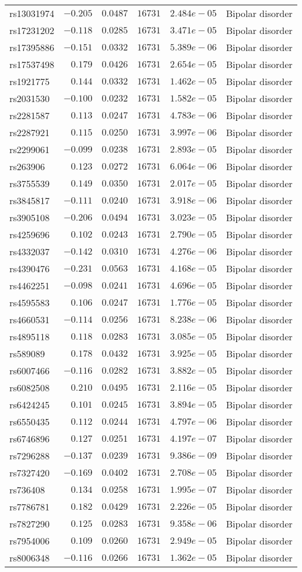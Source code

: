 \begin{tabular}{lrrrrl}
rs13031974&$-0.205$&$0.0487$&$ 16731$&$2.484e-05$&Bipolar disorder\tabularnewline
rs17231202&$-0.118$&$0.0285$&$ 16731$&$3.471e-05$&Bipolar disorder\tabularnewline
rs17395886&$-0.151$&$0.0332$&$ 16731$&$5.389e-06$&Bipolar disorder\tabularnewline
rs17537498&$ 0.179$&$0.0426$&$ 16731$&$2.654e-05$&Bipolar disorder\tabularnewline
rs1921775&$ 0.144$&$0.0332$&$ 16731$&$1.462e-05$&Bipolar disorder\tabularnewline
rs2031530&$-0.100$&$0.0232$&$ 16731$&$1.582e-05$&Bipolar disorder\tabularnewline
rs2281587&$ 0.113$&$0.0247$&$ 16731$&$4.783e-06$&Bipolar disorder\tabularnewline
rs2287921&$ 0.115$&$0.0250$&$ 16731$&$3.997e-06$&Bipolar disorder\tabularnewline
rs2299061&$-0.099$&$0.0238$&$ 16731$&$2.893e-05$&Bipolar disorder\tabularnewline
rs263906&$ 0.123$&$0.0272$&$ 16731$&$6.064e-06$&Bipolar disorder\tabularnewline
rs3755539&$ 0.149$&$0.0350$&$ 16731$&$2.017e-05$&Bipolar disorder\tabularnewline
rs3845817&$-0.111$&$0.0240$&$ 16731$&$3.918e-06$&Bipolar disorder\tabularnewline
rs3905108&$-0.206$&$0.0494$&$ 16731$&$3.023e-05$&Bipolar disorder\tabularnewline
rs4259696&$ 0.102$&$0.0243$&$ 16731$&$2.790e-05$&Bipolar disorder\tabularnewline
rs4332037&$-0.142$&$0.0310$&$ 16731$&$4.276e-06$&Bipolar disorder\tabularnewline
rs4390476&$-0.231$&$0.0563$&$ 16731$&$4.168e-05$&Bipolar disorder\tabularnewline
rs4462251&$-0.098$&$0.0241$&$ 16731$&$4.696e-05$&Bipolar disorder\tabularnewline
rs4595583&$ 0.106$&$0.0247$&$ 16731$&$1.776e-05$&Bipolar disorder\tabularnewline
rs4660531&$-0.114$&$0.0256$&$ 16731$&$8.238e-06$&Bipolar disorder\tabularnewline
rs4895118&$ 0.118$&$0.0283$&$ 16731$&$3.085e-05$&Bipolar disorder\tabularnewline
rs589089&$ 0.178$&$0.0432$&$ 16731$&$3.925e-05$&Bipolar disorder\tabularnewline
rs6007466&$-0.116$&$0.0282$&$ 16731$&$3.882e-05$&Bipolar disorder\tabularnewline
rs6082508&$ 0.210$&$0.0495$&$ 16731$&$2.116e-05$&Bipolar disorder\tabularnewline
rs6424245&$ 0.101$&$0.0245$&$ 16731$&$3.894e-05$&Bipolar disorder\tabularnewline
rs6550435&$ 0.112$&$0.0244$&$ 16731$&$4.797e-06$&Bipolar disorder\tabularnewline
rs6746896&$ 0.127$&$0.0251$&$ 16731$&$4.197e-07$&Bipolar disorder\tabularnewline
rs7296288&$-0.137$&$0.0239$&$ 16731$&$9.386e-09$&Bipolar disorder\tabularnewline
rs7327420&$-0.169$&$0.0402$&$ 16731$&$2.708e-05$&Bipolar disorder\tabularnewline
rs736408&$ 0.134$&$0.0258$&$ 16731$&$1.995e-07$&Bipolar disorder\tabularnewline
rs7786781&$ 0.182$&$0.0429$&$ 16731$&$2.226e-05$&Bipolar disorder\tabularnewline
rs7827290&$ 0.125$&$0.0283$&$ 16731$&$9.358e-06$&Bipolar disorder\tabularnewline
rs7954006&$ 0.109$&$0.0260$&$ 16731$&$2.949e-05$&Bipolar disorder\tabularnewline
rs8006348&$-0.116$&$0.0266$&$ 16731$&$1.362e-05$&Bipolar disorder\tabularnewline

\end{tabular}
